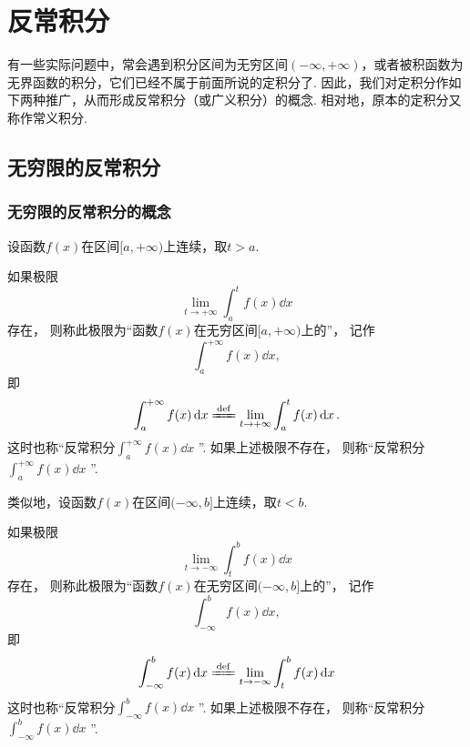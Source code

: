 \chapter{反常积分}
有一些实际问题中，常会遇到积分区间为无穷区间\((-\infty,+\infty)\)，或者被积函数为无界函数的积分，它们已经不属于前面所说的定积分了.
因此，我们对定积分作如下两种推广，从而形成反常积分（或广义积分）的概念.
相对地，原本的定积分又称作常义积分.

\section{无穷限的反常积分}
\subsection{无穷限的反常积分的概念}
\begin{definition}\label{definition:定积分.无穷限的反常积分的定义1}
设函数\(f(x)\)在区间\([a,+\infty)\)上连续，取\(t > a\).

如果极限\[
\lim\limits_{t \to +\infty} \int_a^t f(x) \dd{x}
\]存在，%
则称此极限为“函数\(f(x)\)在无穷区间\([a,+\infty)\)上的”，%
记作\[
\int_a^{+\infty} f(x) \dd{x},
\]
即
\begin{equation}
\int_a^{+\infty} f(x) \dd{x}
\defeq
\lim\limits_{t \to +\infty} \int_a^t f(x) \dd{x}.
\end{equation}
这时也称“反常积分\(\int_a^{+\infty} f(x) \dd{x}\) ”.
如果上述极限不存在，%
则称“反常积分\(\int_a^{+\infty} f(x) \dd{x}\) ”.
\end{definition}

\begin{definition}\label{definition:定积分.无穷限的反常积分的定义2}
类似地，设函数\(f(x)\)在区间\((-\infty,b]\)上连续，取\(t < b\).

如果极限\[
\lim\limits_{t \to -\infty} \int_t^b f(x) \dd{x}
\]存在，%
则称此极限为“函数\(f(x)\)在无穷区间\((-\infty,b]\)上的”，%
记作\[
\int_{-\infty}^b f(x) \dd{x},
\]
即
\begin{equation}
\int_{-\infty}^b f(x) \dd{x}
\defeq
\lim\limits_{t \to -\infty} \int_t^b f(x) \dd{x}
\end{equation}
这时也称“反常积分\(\int_{-\infty}^b f(x) \dd{x}\) ”.
如果上述极限不存在，%
则称“反常积分\(\int_{-\infty}^b f(x) \dd{x}\) ”.
\end{definition}

